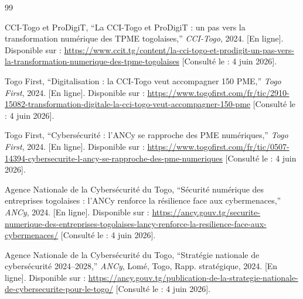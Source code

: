 \documentclass[a4paper,12pt]{article}
\begin{document}
\newpage
\begin{thebibliography}{99}

CCI-Togo et ProDigiT,
``La CCI-Togo et ProDigiT : un pas vers la transformation numérique des TPME togolaises,''
\textit{CCI-Togo}, 2024.
[En ligne]. Disponible sur :
\url{https://www.ccit.tg/content/la-cci-togo-et-prodigit-un-pas-vers-la-transformation-numerique-des-tpme-togolaises}
[Consulté le : 4 juin 2026].

Togo First,
``Digitalisation : la CCI-Togo veut accompagner 150 PME,''
\textit{Togo First}, 2024.
[En ligne]. Disponible sur :
\url{https://www.togofirst.com/fr/tic/2910-15082-transformation-digitale-la-cci-togo-veut-accompagner-150-pme}
[Consulté le : 4 juin 2026].

Togo First,
``Cybersécurité : l'ANCy se rapproche des PME numériques,''
\textit{Togo First}, 2024.
[En ligne]. Disponible sur :
\url{https://www.togofirst.com/fr/tic/0507-14394-cybersecurite-l-ancy-se-rapproche-des-pme-numeriques}
[Consulté le : 4 juin 2026].

Agence Nationale de la Cybersécurité du Togo,
``Sécurité numérique des entreprises togolaises : l'ANCy renforce la résilience face aux cybermenaces,''
\textit{ANCy}, 2024.
[En ligne]. Disponible sur :
\url{https://ancy.gouv.tg/securite-numerique-des-entreprises-togolaises-lancy-renforce-la-resilience-face-aux-cybermenaces/}
[Consulté le : 4 juin 2026].

Agence Nationale de la Cybersécurité du Togo,
``Stratégie nationale de cybersécurité 2024--2028,''
\textit{ANCy}, Lomé, Togo, Rapp. stratégique, 2024.
[En ligne]. Disponible sur :
\url{https://ancy.gouv.tg/publication-de-la-strategie-nationale-de-cybersecurite-pour-le-togo/}
[Consulté le : 4 juin 2026].


\end{thebibliography}
\end{document}
